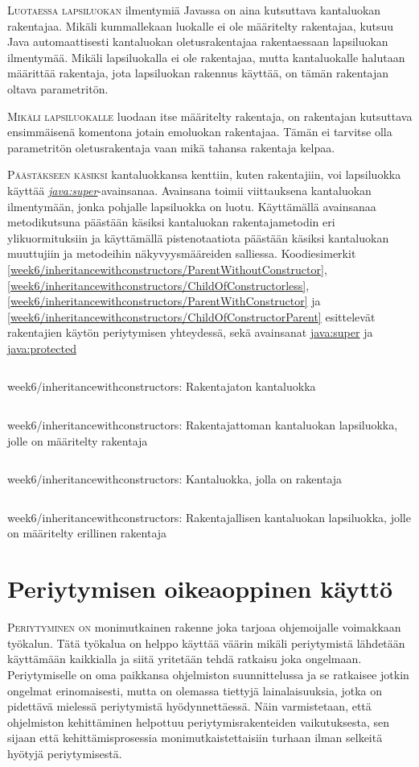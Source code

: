 \documentclass[openany]{book}
\newcommand{\newthought}[1]{\smallskip\textsc{#1}}
\newcommand{\java}[1]{\underline{\gls{java:#1}}}
\newcommand{\newjava}[1]{\textit{\java{#1}}}
\newcommand{\code}[3]{
	\begin{listing}
		\linespread{0.85}
		\inputminted{java}{OhjelmointiopasEsimerkit/src/#1/#2.java}
		\caption{#1: #3}
		\label{#1/#2}
	\end{listing}
}
\begin{document}
\newthought{Luotaessa lapsiluokan} ilmentymiä Javassa on aina kutsuttava kantaluokan rakentajaa.
Mikäli kummallekaan luokalle ei ole määritelty rakentajaa, kutsuu Java automaattisesti kantaluokan
oletusrakentajaa rakentaessaan lapsiluokan ilmentymää. Mikäli lapsiluokalla ei ole rakentajaa,
mutta kantaluokalle halutaan määrittää rakentaja, jota lapsiluokan rakennus käyttää, on tämän
rakentajan oltava parametritön.

\newthought{Mikäli lapsiluokalle} luodaan itse määritelty rakentaja, on rakentajan kutsuttava
ensimmäisenä komentona jotain emoluokan rakentajaa. Tämän ei tarvitse olla parametritön
oletusrakentaja vaan mikä tahansa rakentaja kelpaa.

\newthought{Päästäkseen käsiksi} kantaluokkansa kenttiin, kuten rakentajiin, voi lapsiluokka
käyttää \newjava{super}-avainsanaa. Avainsana toimii viittauksena kantaluokan ilmentymään, jonka
pohjalle lapsiluokka on luotu. Käyttämällä avainsanaa metodikutsuna päästään käsiksi kantaluokan
rakentajametodin eri ylikuormituksiin ja käyttämällä pistenotaatiota päästään käsiksi kantaluokan
muuttujiin ja metodeihin näkyvyysmääreiden salliessa. Koodiesimerkit
\ref{week6/inheritancewithconstructors/ParentWithoutConstructor},
\ref{week6/inheritancewithconstructors/ChildOfConstructorless},
\ref{week6/inheritancewithconstructors/ParentWithConstructor} ja
\ref{week6/inheritancewithconstructors/ChildOfConstructorParent} esittelevät rakentajien käytön
periytymisen yhteydessä, sekä avainsanat \java{super} ja \java{protected}

\code{week6/inheritancewithconstructors}{ParentWithoutConstructor}{Rakentajaton kantaluokka}
\code{week6/inheritancewithconstructors}{ChildOfConstructorless}{Rakentajattoman kantaluokan
lapsiluokka, jolle on määritelty rakentaja}
\code{week6/inheritancewithconstructors}{ParentWithConstructor}{Kantaluokka, jolla on rakentaja}
\code{week6/inheritancewithconstructors}{ChildOfConstructorParent}{Rakentajallisen kantaluokan
lapsiluokka, jolle on määritelty erillinen rakentaja}


\section{Periytymisen oikeaoppinen käyttö}
\label{periytyminen4}

\newthought{Periytyminen on} monimutkainen rakenne joka tarjoaa ohjemoijalle voimakkaan työkalun.
Tätä työkalua on helppo käyttää väärin mikäli periytymistä lähdetään käyttämään kaikkialla ja
siitä yritetään tehdä ratkaisu joka ongelmaan. Periytymiselle on oma paikkansa ohjelmiston
suunnittelussa ja se ratkaisee jotkin ongelmat erinomaisesti, mutta on olemassa tiettyjä
lainalaisuuksia, jotka on pidettävä mielessä periytymistä hyödynnettäessä. Näin varmistetaan, että
ohjelmiston kehittäminen helpottuu periytymisrakenteiden vaikutuksesta, sen sijaan että
kehittämisprosessia monimutkaistettaisiin turhaan ilman selkeitä hyötyjä periytymisestä.
\end{document}
